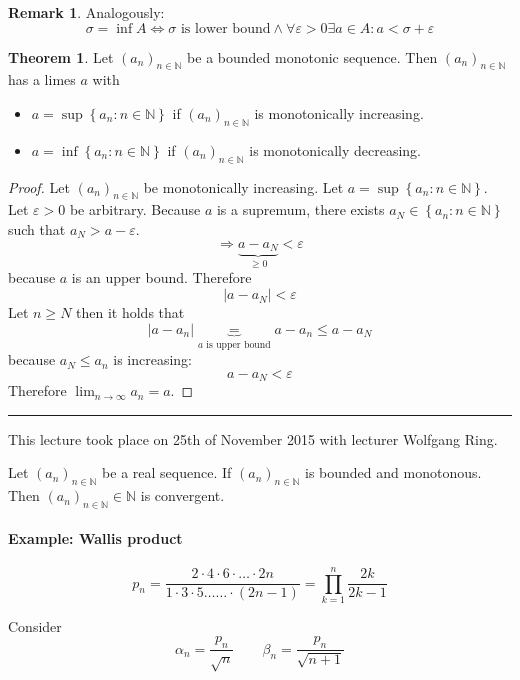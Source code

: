 \documentclass[a4paper,landscape,twocolumn]{article}
\theoremstyle{definition}
\newtheorem{theorem}{Theorem}
\newtheorem{rem}{Remark}
\newcommand\set[1]{\left\{#1\right\}}
\newcommand\abs[1]{\left|#1\right|}
\newcommand\seq[1]{{\left(#1\right)}_{n \in \mathbb N}}
\newcommand\meta[3]{\hrule{} This #1 took place on #2 with lecturer #3.\par}
\begin{document}
\begin{rem}
  Analogously:
  \[ \sigma = \inf{A} \Leftrightarrow \sigma \text{ is lower bound} \land \forall \varepsilon > 0 \exists a \in A: a < \sigma + \varepsilon \]
\end{rem}

\begin{theorem}
  \label{monotonic-in-R}
  Let $(a_n)_{n \in \mathbb N}$ be a bounded monotonic sequence.
  Then $\seq{a_n}$ has a limes $a$ with
  \begin{itemize}
    \item $a = \sup\set{a_n: n \in \mathbb N}$ if $\seq{a_n}$ is monotonically increasing.
    \item $a = \inf\set{a_n: n \in \mathbb N}$ if $\seq{a_n}$ is monotonically decreasing.
  \end{itemize}
\end{theorem}

\begin{proof}
  Let $\seq{a_n}$ be monotonically increasing. Let $a = \sup\set{a_n: n \in \mathbb N}$.
  Let $\varepsilon > 0$ be arbitrary. Because $a$ is a supremum, there exists $a_N \in \set{a_n: n \in \mathbb N}$
  such that $a_N > a - \varepsilon$.
  \[ \Rightarrow \underbrace{a - a_N}_{\geq 0} < \varepsilon \]
  because $a$ is an upper bound. Therefore
  \[ \abs{a - a_N} < \varepsilon \]
  Let $n \geq N$ then it holds that
  \[ \abs{a - a_n} \underbrace{=}_{a \text{ is upper bound}} a - a_n \leq a - a_N \]
  because $a_N \leq a_n$ is increasing:
  \[ a - a_N < \varepsilon \]
  Therefore $\lim_{n \rightarrow \infty} a_n = a$.
\end{proof}

\meta{lecture}{25th of November 2015}{Wolfgang Ring}

Let $\seq{a_n}$ be a real sequence.
If $\seq{a_n}$ is bounded and monotonous.
Then $\seq{a_n} \in \mathbb N$ is convergent.

\paragraph{Example: Wallis product}


\[
    p_n
    = \frac{2 \cdot 4 \cdot 6 \cdot \ldots \cdot 2n}{1 \cdot 3 \cdot 5 \dots \ldots \cdot (2n-1)}
    = \prod_{k=1}^n \frac{2k}{2k-1}
\]

Consider
\[ \alpha_n = \frac{p_n}{\sqrt{n}} \qquad \beta_n = \frac{p_n}{\sqrt{n+1}} \]
\end{document}
